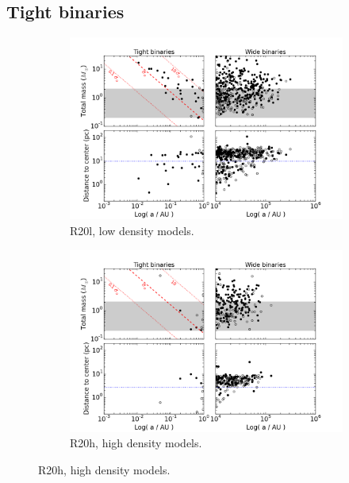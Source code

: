 \subsection{Tight binaries}



\begin{figure}
\begin{center}
    \begin{subfigure}[b]{0.9\textwidth}
    	\centering
    	\includegraphics[width=\textwidth]{Figures/6_extreme_binaries_LD}
        \caption{R20l, low density models.}
        \label{Fig:6_extreme_LD}
    \end{subfigure}
    \begin{subfigure}[b]{0.9\textwidth}
    	\centering
    	\includegraphics[width=\textwidth]{Figures/6_extreme_binaries_HD}
        \caption{R20h, high density models.}
		\label{Fig:6_extreme_HD}	        

\end{subfigure}
\end{center}
\end{figure}
